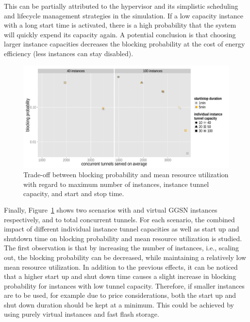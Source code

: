 This can be partially attributed to the hypervisor and its simplistic scheduling  and lifecycle management strategies in the simulation. If a low capacity instance with a long start time is activated, there is a high probability that the system will quickly expend its capacity again.
A potential conclusion is that choosing larger instance capacities decreases the blocking probability at the cost of energy efficiency (less instances can stay disabled).


\begin{figure}[htb]
	\centering
	\includegraphics[width=1.0\textwidth]{images/R-virtualized-startstop-tunnelusage-blocking-comparison.pdf}
	\caption{Trade-off between blocking probability and mean resource utilization with regard to maximum number of instances, instance tunnel capacity, and start and stop time.}
\label{c4:fig:compare_util_block}
\end{figure}


Finally, Figure~\ref{c4:fig:compare_util_block} shows two scenarios with  and  virtual \gls{GGSN} instances respectively, and  to  total concurrent tunnels. For each scenario, the combined impact of different individual instance tunnel capacities as well as start up and shutdown time on blocking probability and mean resource utilization is studied. The first observation is that by increasing the number of instances, i.e., scaling out, the blocking probability can be decreased, while maintaining a relatively low mean resource utilization. In addition to the previous effects, it can be noticed that a higher start up and shut down time causes a slight increase in blocking probability for instances with low tunnel capacity. Therefore, if smaller instances are to be used, for example due to price considerations, both the start up and shut down duration should be kept at a minimum. This could be achieved by using purely virtual instances and fast flash storage.


